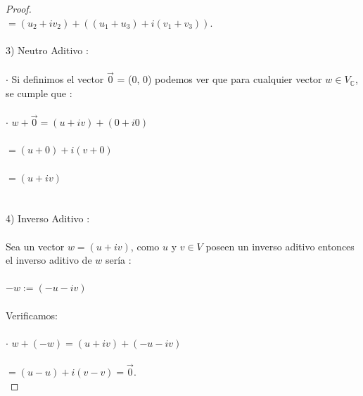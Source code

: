 \documentclass[11pt]{article}
\theoremstyle{definition} %
\begin{document}
\begin{proof}
\\

$= (u_2 +iv_2) + ((u_1 + u_3) + i(v_1 + v_3))$.\\

\\

3) Neutro Aditivo : \\

\\

$\cdot$ Si definimos el vector $\vec{0}$ = (0, 0) podemos ver que para cualquier vector $w \in V_\mathbb{C}$, se cumple que :\\

\\

$\cdot$ $w + \vec{0} = (u + iv) + (0 + i0)$\\

\\

$= (u + 0) + i(v + 0)$\\

\\

$= (u + iv)$\\

\\

\\

4) Inverso Aditivo :\\

\\

Sea un vector $w = (u + iv)$, como $u$ y $v \in V$ poseen un inverso aditivo entonces el inverso aditivo de $w$ sería :\\

\\

$-w := (-u -iv)$\\

\\

Verificamos:\\

\\

$\cdot$ $w + (-w) = (u +iv) + (-u -iv)$\\

\\

$= (u -u) + i(v -v) = \vec{0}$.\\


\end{proof}
\end{document}
